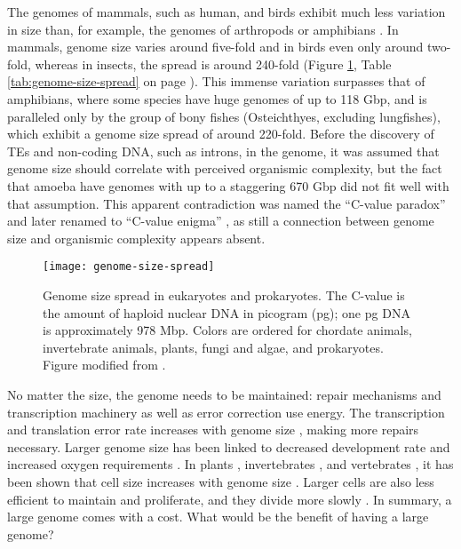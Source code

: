 The genomes of mammals, such as human, and birds exhibit much less
variation in size than, for example, the genomes of arthropods or
amphibians \citep{Gregory2005}.  In mammals, genome size varies around
five-fold and in birds even only around two-fold, whereas in insects,
the spread is around 240-fold (Figure \ref{fig:genome-size-spread},
Table \ref{tab:genome-size-spread} on page
\pageref{tab:genome-size-spread}).  This immense variation surpasses that
of amphibians, where some species have huge genomes of up to 118 Gbp,
and is paralleled only by the group of bony fishes (Osteichthyes,
excluding lungfishes), which exhibit a genome size spread of around
220-fold.  Before the discovery of TEs and non-coding DNA, such as
introns, in the genome, it was assumed that genome size should correlate
with perceived organismic complexity, but the fact that amoeba have
genomes with up to a staggering 670 Gbp \citep{Parfrey2008} did not fit
well with that assumption.  This apparent contradiction was named the
``C-value paradox'' and later renamed to ``C-value enigma''
\citep{Gregory2007}, as still a connection between genome size and
organismic complexity appears absent.

\begin{figure}
\centering
\texttt{[image: genome-size-spread]}
\caption[Genome size spread in eukaryotes and prokaryotes]{Genome size
spread in eukaryotes and prokaryotes.  The C-value is the amount of
haploid nuclear DNA in picogram (pg); one pg DNA is approximately 978
Mbp.  Colors are ordered for chordate animals, invertebrate animals,
plants, fungi and algae, and prokaryotes.  Figure modified from
\citet{Gregory2004}.}
\label{fig:genome-size-spread}
\end{figure}

No matter the size, the genome needs to be maintained: repair mechanisms
and transcription machinery as well as error correction use energy.  The
transcription and translation error rate increases with genome size
\citep{Zaher2009}, making more repairs necessary.  Larger genome size has
been linked to decreased development rate \citep{White2000} and
increased oxygen requirements \citep{Vinogradov1997, Gregory2002}.  In
plants \citep{Grime1983}, invertebrates \citep{Gregory2005}, and
vertebrates \citep{Horner1983, Olmo1982, Gregory2000}, it has been shown
that cell size increases with genome size \citep{Dufresne2011}.  Larger
cells are also less efficient to maintain and proliferate, and they
divide more slowly \citep{Bennett1977}.  In summary, a large genome comes
with a cost.  What would be the benefit of having a large genome?

